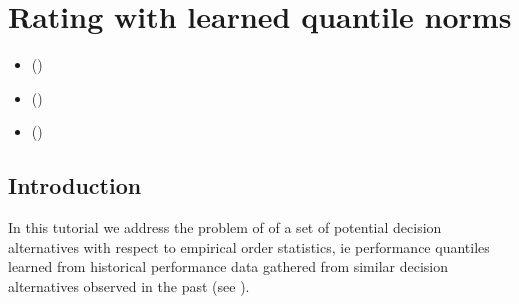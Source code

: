 \documentclass[a4paper,10pt,english]{sphinxhowto}
\begin{document}
\section{Rating with learned quantile norms}
\label{\detokenize{tutorial:rating-with-learned-quantile-norms}}\label{\detokenize{tutorial:rating-tutorial-label}}
\begin{sphinxShadowBox}
\begin{itemize}
\item {} 
\label{\detokenize{tutorial:id216}}{\hyperref[\detokenize{tutorial:id45}]{}} ()

\item {} 
\label{\detokenize{tutorial:id217}}{\hyperref[\detokenize{tutorial:incremental-learning-of-historical-performance-quantiles}]{}} ()

\item {} 
\label{\detokenize{tutorial:id218}}{\hyperref[\detokenize{tutorial:rating-new-performances-with-quantile-norms}]{}} ()

\end{itemize}
\end{sphinxShadowBox}


\subsection{Introduction}
\label{\detokenize{tutorial:id45}}
In this tutorial we address the problem of  of a set of potential decision alternatives with respect to empirical order statistics, ie performance quantiles learned from historical performance data gathered from similar decision alternatives observed in the past (see ).
\end{document}
